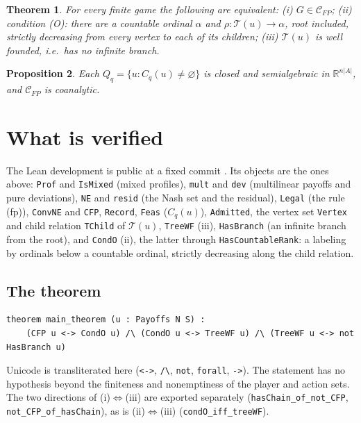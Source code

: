 \documentclass[11pt]{article}
\newtheorem{theorem}{Theorem}
\newtheorem{proposition}[theorem]{Proposition}
\theoremstyle{definition}
\newcommand{\R}{\mathbb R}
\begin{document}
\begin{theorem}\label{main}
For every finite game the following are equivalent:
\textup{(i)} $G\in\mathcal C_{FP}$;
\textup{(ii)} condition \textup{(O)}: there are a countable ordinal $\alpha$ and $\rho:\mathcal T(u)\to\alpha$, root included, strictly decreasing from every vertex to each of its children;
\textup{(iii)} $\mathcal T(u)$ is well founded, i.e.\ has no infinite branch.
\end{theorem}

\begin{proposition}\label{coan}
Each $Q_q=\{u:C_q(u)\ne\varnothing\}$ is closed and semialgebraic in $\R^{n|A|}$, and $\mathcal C_{FP}$ is coanalytic.
\end{proposition}

\section{What is verified}

The Lean development is public at a fixed commit \cite{Lean}. Its objects are the ones above: \texttt{Prof} and \texttt{IsMixed} (mixed profiles), \texttt{mult} and \texttt{dev} (multilinear payoffs and pure deviations), \texttt{NE} and \texttt{resid} (the Nash set and the residual), \texttt{Legal} (the rule (fp)), \texttt{ConvNE} and \texttt{CFP}, \texttt{Record}, \texttt{Feas} ($C_q(u)$), \texttt{Admitted}, the vertex set \texttt{Vertex} and child relation \texttt{TChild} of $\mathcal T(u)$, \texttt{TreeWF} (iii), \texttt{HasBranch} (an infinite branch from the root), and \texttt{CondO} (ii), the latter through \texttt{HasCountableRank}: a labeling by ordinals below a countable ordinal, strictly decreasing along the child relation.

\subsection*{The theorem}
\begin{verbatim}
theorem main_theorem (u : Payoffs N S) :
    (CFP u <-> CondO u) /\ (CondO u <-> TreeWF u) /\ (TreeWF u <-> not HasBranch u)
\end{verbatim}
Unicode is transliterated here (\texttt{<->}, \texttt{/\textbackslash}, \texttt{not}, \texttt{forall}, \texttt{->}). The statement has no hypothesis beyond the finiteness and nonemptiness of the player and action sets. The two directions of (i)$\Leftrightarrow$(iii) are exported separately (\texttt{hasChain\_of\_not\_CFP}, \texttt{not\_CFP\_of\_hasChain}), as is (ii)$\Leftrightarrow$(iii) (\texttt{condO\_iff\_treeWF}).
\end{document}
